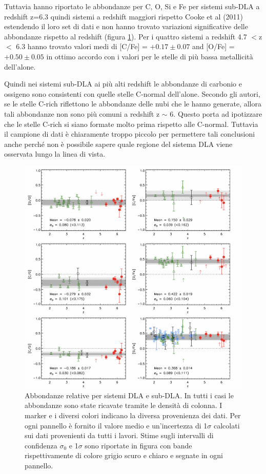 \documentclass[12pt]{article}
\begin{document}
Tuttavia \cite{Becker} hanno riportato le abbondanze per C, O, Si e Fe per sistemi sub-DLA a redshift z=6.3 quindi sistemi a redshift maggiori rispetto Cooke et al (2011) estendendo il loro set di dati e non hanno trovato variazioni significative delle abbondanze rispetto al redshift (figura \ref{dla}). Per i quattro sistemi a redshift 4.7 $<$z$<$ 6.3 hanno trovato valori medi di [C/Fe] = $+0.17 \pm 0.07$ and [O/Fe] = $+0.50  \pm 0.05$ in ottimo accordo con i valori per le stelle di più bassa metallicità dell'alone.

Quindi nei sistemi sub-DLA ai più alti redshift le abbondanze di carbonio e ossigeno sono consistenti con quelle stelle C-normal dell’alone. Secondo gli autori, se le stelle C-rich riflettono le abbondanze delle nubi che le hanno generate, allora tali abbondanze non sono più comuni a redshift z $\sim$ 6. Questo porta ad ipotizzare che le stelle C-rich si siano formate molto prima rispetto alle C-normal.
Tuttavia il campione di dati è chiaramente troppo piccolo per permettere tali conclusioni anche perché non è possibile sapere quale regione del sistema DLA viene osservata lungo la linea di vista.


\begin{figure}[htp!]
\center
  \includegraphics[width=1 \textwidth]{Becker}
  \caption{ Abbondanze relative per sistemi DLA e sub-DLA. In tutti i casi le abbondanze sono state ricavate tramite le densità di colonna. I marker e i diversi colori indicano la diversa provenienza dei dati. Per ogni pannello è fornito il valore medio e un’incertezza di 1$\sigma$ calcolati sui dati provenienti da tutti i lavori. Stime sugli intervalli di confidenza $\sigma_{0}$ e 1$\sigma$ sono riportate in figura con bande rispettivamente di colore grigio scuro e chiaro e segnate in ogni pannello. \cite{Becker}
}
  \label{dla}
\end{figure}
\end{document}
